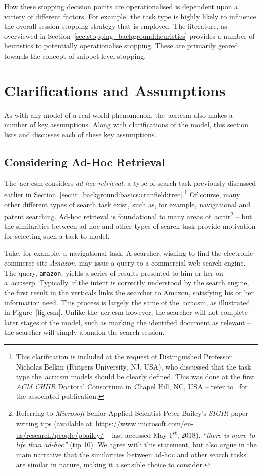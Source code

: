 How these stopping decision points are operationalised is dependent upon a variety of different factors. For example, the task type is highly likely to influence the overall session stopping strategy that is employed. The literature, as overviewed in Section~\ref{sec:stopping_background:heuristics} provides a number of heuristics to potentially operationalise stopping. These are primarily geared towards the concept of snippet level stopping.

\section{Clarifications and Assumptions}\label{sec:csm:csm:assumptions}
As with any model of a real-world phenomenon, the~\gls{acr:csm} also makes a number of key assumptions. Along with clarifications of the model, this section lists and discusses each of these key assumptions.

\subsection{Considering Ad-Hoc Retrieval} The~\gls{acr:csm} considers \emph{ad-hoc retrieval,} a type of search task previously discussed earlier in Section~\ref{sec:ir_background:basics:cranfield:trec}.\footnote{This clarification is included at the request of Distinguished Professor Nicholas Belkin (Rutgers University, NJ, USA), who discussed that the task type the~\gls{acr:csm} models should be clearly defined. This was done at the first \emph{ACM CHIIR} Doctoral Consortium in Chapel Hill, NC, USA -- refer to~\cite{maxwell2016dc} for the associated publication.} Of course, many other different types of search task exist, such as, for example, navigational and patent searching. Ad-hoc retrieval is foundational to many areas of~\gls{acr:ir}\footnote{Referring to \emph{Microsoft} Senior Applied Scientist Peter Bailey's \emph{SIGIR} paper writing tips (available at~\url{https://www.microsoft.com/en-us/research/people/pbailey/} -- last accessed May 1\textsuperscript{st}, 2018), \emph{``there is more to life than ad-hoc''} (tip 10). We agree with this statement, but also argue in the main narrative that the similarities between ad-hoc and other search tasks are similar in nature, making it a sensible choice to consider.} -- but the similarities between ad-hoc and other types of search task provide motivation for selecting such a task to model.

Take, for example, a navigational task. A searcher, wishing to find the electronic commerce site \emph{Amazon}, may issue a query to a commercial web search engine. The query, \texttt{amazon}, yields a series of results presented to him or her on a~\gls{acr:serp}. Typically, if the intent is correctly understood by the search engine, the first result in the verticals links the searcher to Amazon, satisfying his or her information need. This process is largely the same of the~\gls{acr:csm}, as illustrated in Figure~\ref{fig:csm}. Unlike the~\gls{acr:csm} however, the searcher will not complete later stages of the model, such as marking the identified document as relevant -- the searcher will simply abandon the search session.

